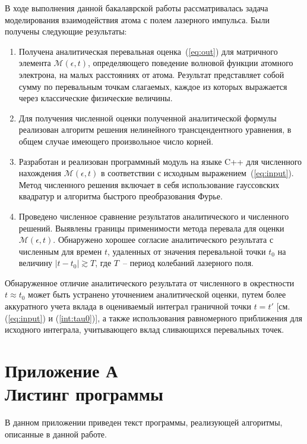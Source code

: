 \documentclass[14pt, a4paper]{article}
\numberwithin{figure}{section}
\numberwithin{equation}{section}
\newcommand{\cM}{\mathcal{M}}
\begin{document}
В ходе выполнения данной бакалаврской работы рассматривалась задача моделирования взаимодействия атома с полем лазерного импульса. Были получены следующие результаты:
\begin{enumerate}
\item
Получена аналитическая перевальная оценка~(\ref{eq:out}) для матричного элемента $\cM(\epsilon,t)$, определяющего поведение волновой функции атомного электрона,  на малых расстояниях от атома. Результат представляет собой сумму по перевальным точкам слагаемых, каждое из которых выражается через классические физические величины.
\item 
Для получения численной оценки полученной аналитической формулы реализован алгоритм решения нелинейного трансцендентного уравнения, в общем случае имеющего произвольное число корней.
\item 
Разработан и реализован программный модуль на языке C++ для численного нахождения $\cM(\epsilon,t)$ в соответствии с исходным выражением~(\ref{eq:input}). Метод численного решения включает в себя использование гауссовских квадратур и алгоритма быстрого преобразования Фурье.
\item
Проведено численное сравнение результатов аналитического и численного решений. Выявлены границы применимости метода перевала для оценки $\cM(\epsilon,t)$. Обнаружено хорошее согласие аналитического результата с численным для времен $t$, удаленных от значения перевальной точки $t_0$ на величину $|t-t_0|\gtrsim T$, где $T$~-- период колебаний лазерного поля.
\end{enumerate}

Обнаруженное отличие аналитического результата от численного в окрестности $t\approx t_0$ может быть устранено уточнением аналитической оценки, путем более аккуратного учета вклада в оцениваемый интеграл граничной точки $t=t'$ [см. (\ref{eq:input}) и (\ref{int:tau0})], а также использования равномерного приближения для исходного интеграла, учитывающего вклад сливающихся перевальных точек.


\newpage
{}



\newpage
{}
\section*{Приложение А\\Листинг программы}\label{attachA}

В данном приложении приведен текст программы, реализующей алгоритмы, описанные в данной работе.


\end{document}
